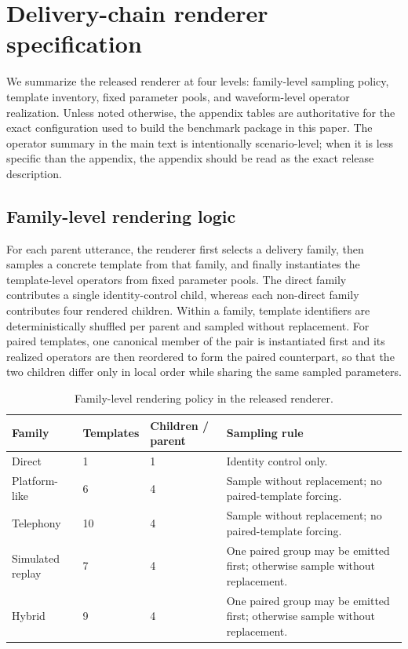 \appendix

\section{Delivery-chain renderer specification}
\label{app:renderer_spec}

We summarize the released renderer at four levels: family-level sampling policy, template inventory, fixed parameter pools, and waveform-level operator realization. Unless noted otherwise, the appendix tables are authoritative for the exact configuration used to build the benchmark package in this paper. The operator summary in the main text is intentionally scenario-level; when it is less specific than the appendix, the appendix should be read as the exact release description.

\subsection{Family-level rendering logic}

For each parent utterance, the renderer first selects a delivery family, then samples a concrete template from that family, and finally instantiates the template-level operators from fixed parameter pools. The direct family contributes a single identity-control child, whereas each non-direct family contributes four rendered children. Within a family, template identifiers are deterministically shuffled per parent and sampled without replacement. For paired templates, one canonical member of the pair is instantiated first and its realized operators are then reordered to form the paired counterpart, so that the two children differ only in local order while sharing the same sampled parameters.

\begin{table}[t]
\caption{Family-level rendering policy in the released renderer.}
\label{tab:appendix_family_policy}
\centering
\small
\setlength{\tabcolsep}{5pt}
\renewcommand{\arraystretch}{1.10}
\begin{tabular}{@{}p{}p{}p{}p{}@{}}
\toprule
\textbf{Family} & \textbf{Templates} & \textbf{Children / parent} & \textbf{Sampling rule} \\
\midrule
Direct & 1 & 1 & Identity control only. \\
Platform-like & 6 & 4 & Sample without replacement; no paired-template forcing. \\
Telephony & 10 & 4 & Sample without replacement; no paired-template forcing. \\
Simulated replay & 7 & 4 & One paired group may be emitted first; otherwise sample without replacement. \\
Hybrid & 9 & 4 & One paired group may be emitted first; otherwise sample without replacement. \\
\bottomrule
\end{tabular}
\end{table}


